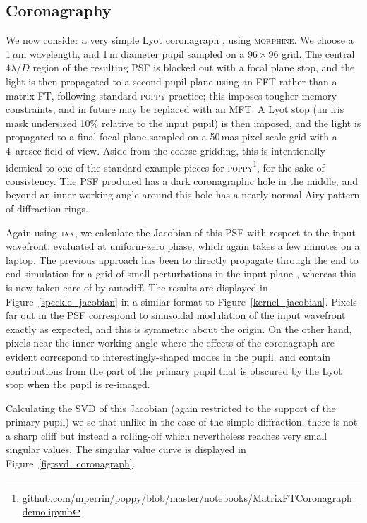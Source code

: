 \documentclass[modern]{aastex63}
\begin{document}
\subsection{Coronagraphy}
\label{sec:coronagraph}

We now consider a very simple Lyot coronagraph \citep{lyot30}, using \textsc{morphine}. We choose a 1\,$\mu$m wavelength, and 1\,m diameter pupil sampled on a $96\times96$ grid. The central $4 \lambda/D$ region of the resulting PSF is blocked out with a focal plane stop, and the light is then propagated to a second pupil plane using an FFT rather than a matrix FT, following standard \textsc{poppy} practice; this imposes tougher memory constraints, and in future may be replaced with an MFT. A Lyot stop (an iris mask undersized 10\% relative to the input pupil) is then imposed, and the light is propagated to a final focal plane sampled on a 50\,mas pixel scale grid with a 4~arcsec field of view. Aside from the coarse gridding, this is intentionally identical to one of the standard example pieces for \textsc{poppy}\footnote{\href{https://github.com/mperrin/poppy/blob/master/notebooks/MatrixFTCoronagraph_demo.ipynb}{github.com/mperrin/poppy/blob/master/notebooks/MatrixFTCoronagraph\_demo.ipynb}}, for the sake of consistency. The PSF produced has a dark coronagraphic hole in the middle, and beyond an inner working angle around this hole has a nearly normal Airy pattern of diffraction rings.

Again using \textsc{jax}, we calculate the Jacobian of this PSF with respect to the input wavefront, evaluated at uniform-zero phase, which again takes a few minutes on a laptop. The previous approach has been to directly propagate through the end to end simulation for a grid of small perturbations in the input plane \citep{falco}, whereas this is now taken care of by autodiff. The results are displayed in Figure~\ref{speckle_jacobian} in a similar format to Figure~\ref{kernel_jacobian}. Pixels far out in the PSF correspond to sinusoidal modulation of the input wavefront exactly as expected, and this is symmetric about the origin. On the other hand, pixels near the inner working angle where the effects of the coronagraph are evident correspond to interestingly-shaped modes in the pupil, and contain contributions from the part of the primary pupil that is obscured by the Lyot stop when the pupil is re-imaged. 

Calculating the SVD of this Jacobian (again restricted to the support of the primary pupil) we se that unlike in the case of the simple diffraction, there is not a sharp cliff but instead a rolling-off which nevertheless reaches very small singular values. The singular value curve is displayed in Figure~\ref{fig:svd_coronagraph}. 
\end{document}
